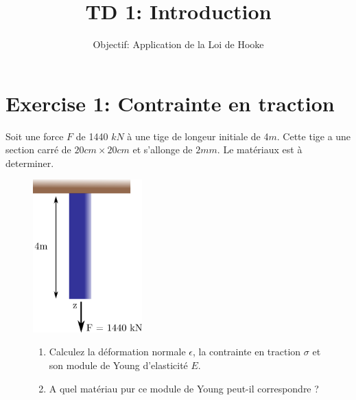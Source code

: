 \documentclass[
]{article}
\title{TD 1: Introduction}
\subtitle{Objectif: Application de la Loi de Hooke}
\author{}
\date{}
\begin{document}
\maketitle
\ifdefined\Shaded\renewenvironment{Shaded}{\begin{tcolorbox}[sharp corners, frame hidden, boxrule=0pt, enhanced, borderline west={3pt}{0pt}{shadecolor}, breakable, interior hidden]}{\end{tcolorbox}}\fi

\thispagestyle{fancy}

\hypertarget{exercise-1-contrainte-en-traction}{%
\section{Exercise 1: Contrainte en
traction}\label{exercise-1-contrainte-en-traction}}

Soit une force \(F\) de 1440 \(kN\) à une tige de longeur initiale de
4\(m\). Cette tige a une section carré de \(20cm \times 20cm\) et
s'allonge de \(2mm\). Le matériaux est à determiner.

\begin{figure}

\begin{minipage}[c]{0.35\linewidth}

{\centering 

\includegraphics[width=4.2cm,height=\textheight]{../assets/img/TD1/Ex1.png}

}

\end{minipage}%
%
\begin{minipage}[c]{0.65\linewidth}

{\centering 

\begin{enumerate}
\def\labelenumi{\arabic{enumi}.}
\item
  Calculez la déformation normale \(\epsilon\), la contrainte en
  traction \(\sigma\) et son module de Young d'elasticité \(E\).
\item
  A quel matériau pur ce module de Young peut-il correspondre ?
\end{enumerate}

}

\end{minipage}%

\end{figure}
\end{document}
